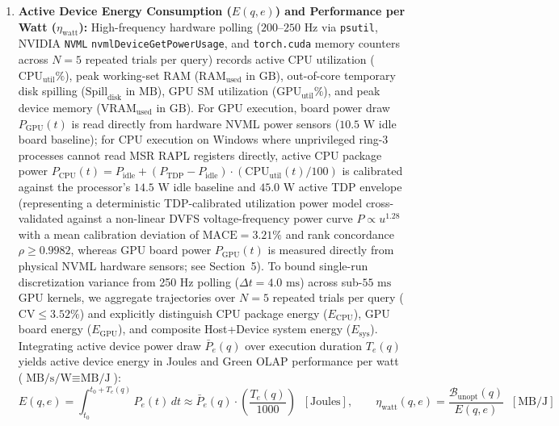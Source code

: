 \documentclass[10pt,a4paper]{article}
\begin{document}
\begin{enumerate}[leftmargin=1.5em,itemsep=3pt]
\begin{equation}
    \end{equation}
    \item \textbf{Active Device Energy Consumption ($E(q,e)$) and Performance per Watt ($\eta_{\text{watt}}$):} High-frequency hardware polling ($200\text{--}250\text{ Hz}$ via \texttt{psutil}, NVIDIA \texttt{NVML} \texttt{nvmlDeviceGetPowerUsage}, and \texttt{torch.cuda} memory counters across $N=5$ repeated trials per query) records active CPU utilization ($\text{CPU}_{\text{util}}\%$), peak working-set RAM ($\text{RAM}_{\text{used}}$ in $\text{GB}$), out-of-core temporary disk spilling ($\text{Spill}_{\text{disk}}$ in $\text{MB}$), GPU SM utilization ($\text{GPU}_{\text{util}}\%$), and peak device memory ($\text{VRAM}_{\text{used}}$ in $\text{GB}$). For GPU execution, board power draw $P_{\text{GPU}}(t)$ is read directly from hardware NVML power sensors ($10.5\text{ W}$ idle board baseline); for CPU execution on Windows where unprivileged ring-3 processes cannot read MSR RAPL registers directly, active CPU package power $P_{\text{CPU}}(t) = P_{\text{idle}} + (P_{\text{TDP}} - P_{\text{idle}}) \cdot (\text{CPU}_{\text{util}}(t)/100)$ is calibrated against the processor's $14.5\text{ W}$ idle baseline and $45.0\text{ W}$ active TDP envelope (representing a deterministic TDP-calibrated utilization power model cross-validated against a non-linear DVFS voltage-frequency power curve $P \propto u^{1.28}$ with a mean calibration deviation of $\text{MACE} = 3.21\%$ and rank concordance $\rho \ge 0.9982$, whereas GPU board power $P_{\text{GPU}}(t)$ is measured directly from physical NVML hardware sensors; see Section~5). To bound single-run discretization variance from 250 Hz polling ($\Delta t = 4.0\text{ ms}$) across sub-$55\text{ ms}$ GPU kernels, we aggregate trajectories over $N=5$ repeated trials per query ($\text{CV} \le 3.52\%$) and explicitly distinguish CPU package energy ($E_{\text{CPU}}$), GPU board energy ($E_{\text{GPU}}$), and composite Host+Device system energy ($E_{\text{sys}}$). Integrating active device power draw $\bar{P}_e(q)$ over execution duration $T_e(q)$ yields active device energy in Joules and Green OLAP performance per watt ($\text{MB/s/W} \equiv \text{MB/J}$):
    \begin{equation}
        E(q, e) = \int_{t_0}^{t_0 + T_e(q)} P_e(t)\,dt \approx \bar{P}_e(q) \cdot \left(\frac{T_e(q)}{1000}\right) \;\; [\text{Joules}], \qquad \eta_{\text{watt}}(q, e) = \frac{\mathcal{B}_{\text{unopt}}(q)}{E(q, e)} \;\; [\text{MB/J}]
    \end{equation}
\end{enumerate}
\end{document}
